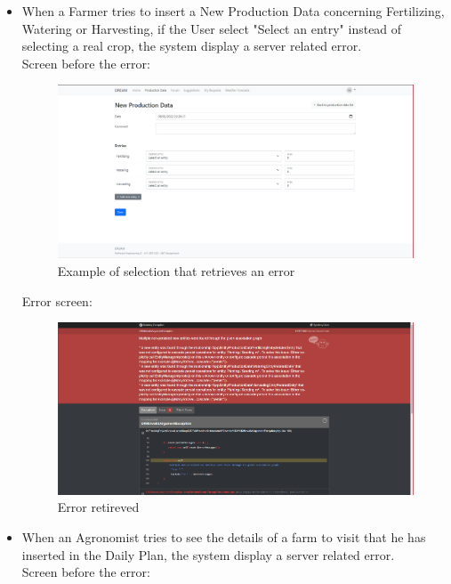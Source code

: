\begin{itemize}
   \FloatBarrier
    \item When a Farmer tries to insert a New Production Data concerning Fertilizing, Watering or Harvesting, if the User select "Select an entry" instead of selecting a real crop, the system display a server related error.\\
    Screen before the error:
    \begin{figure}[h!]
        \centering
        \includegraphics[scale=0.25]{images/additional_notes/production_data_screen.png}
        \caption{Example of selection that retrieves an error}
        \label{fig:my_label}
    \end{figure}
   \newpage
    Error screen:
    \begin{figure}[h!]
        \centering
        \includegraphics[scale=0.25]{images/additional_notes/production_data_screen_error.png}
        \caption{Error retireved}
        \label{fig:my_label}
    \end{figure}
    \FloatBarrier
    \item When an Agronomist tries to see the details of a farm to visit that he has inserted in the Daily Plan, the system display a server related error.\\
    Screen before the error:
    \begin{figure}[h!]

\end{figure}
\end{itemize}
